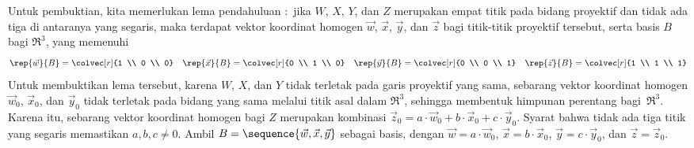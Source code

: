 Untuk pembuktian, kita memerlukan lema pendahuluan \cite{Coxeter}:~jika $W$,
$X$, $Y$, dan $Z$ merupakan empat titik pada bidang proyektif dan tidak ada
tiga di antaranya yang segaris, maka terdapat vektor koordinat homogen
$\vec{w}$, $\vec{x}$, $\vec{y}$, dan $\vec{z}$ bagi titik-titik proyektif
tersebut, serta basis $B$ bagi $\Re^3$, yang memenuhi
\begin{equation*}
  \rep{\vec{w}}{B}=\colvec[r]{1 \\ 0 \\ 0}
  \quad
  \rep{\vec{x}}{B}=\colvec[r]{0 \\ 1 \\ 0}
  \quad
  \rep{\vec{y}}{B}=\colvec[r]{0 \\ 0 \\ 1}
  \quad
  \rep{\vec{z}}{B}=\colvec[r]{1 \\ 1 \\ 1}
\end{equation*}
Untuk membuktikan lema tersebut, karena $W$, $X$, dan $Y$ tidak terletak pada
garis proyektif yang sama, sebarang vektor koordinat homogen
$\vec{w}_0$, $\vec{x}_0$, dan $\vec{y}_0$ tidak terletak pada bidang yang sama
melalui titik asal dalam $\Re^3$, sehingga membentuk himpunan perentang
bagi~$\Re^3$.
Karena itu, sebarang vektor koordinat homogen bagi $Z$ merupakan kombinasi
$\vec{z}_0=a\cdot\vec{w}_0+b\cdot\vec{x}_0+c\cdot\vec{y}_0$.
Syarat bahwa tidak ada tiga titik yang segaris memastikan
$a,b,c\neq0$.
Ambil $B=\sequence{\vec{w},\vec{x},\vec{y}}$ sebagai basis, dengan
$\vec{w}=a\cdot\vec{w}_0$, $\vec{x}=b\cdot\vec{x}_0$,
$\vec{y}=c\cdot\vec{y}_0$, dan $\vec{z}=\vec{z}_0$.

